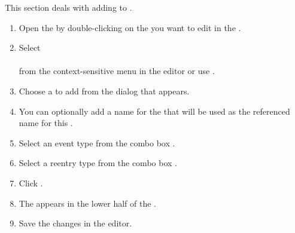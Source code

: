 


This section deals with adding \gdehandlers{} to \gdcases{}.

\begin{enumerate}
\item Open the \gdtestcaseeditor{} by double-clicking on the \gdcase{} you want to edit in the \gdtestcasebrowser{}.   
\item Select\\
 \\from the context-sensitive menu in the editor or use . 
\item Choose a \gdcase{} to add from the dialog that appears.
\item You can optionally add a name for the \gdehandler{} that will be used as the referenced name for this \gdehandler{}.
\item Select an event type from the combo box .
\item Select a reentry type from the combo box . 
\item Click . 
\item The \gdehandler{} appears in the lower half of the \gdtestcaseeditor{}. 
\item Save the changes in the editor.
\end{enumerate}

